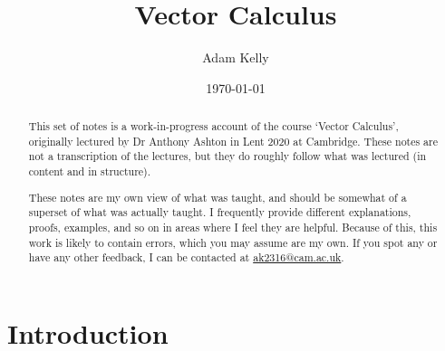 \documentclass[a4paper]{scrreprt}
\title{Vector Calculus}
\author{Adam Kelly}
\date{\today}
\begin{document}
\maketitle

\begin{abstract}
	This set of notes is a work-in-progress account of the course `Vector Calculus', originally lectured by Dr Anthony Ashton in Lent 2020 at Cambridge. These notes are not a transcription of the lectures, but they do roughly follow what was lectured (in content and in structure).

	These notes are my own view of what was taught, and should be somewhat of a superset of what was actually taught. I frequently provide different explanations, proofs, examples, and so on in areas where I feel they are helpful. Because of this, this work is likely to contain errors, which you may assume are my own. If you spot any or have any other feedback, I can be contacted at \href{mailto:ak2316@cam.ac.uk}{ak2316@cam.ac.uk}.
\end{abstract}

\tableofcontents

\clearpage
\chapter{Introduction}





	

	

	
\end{document}
